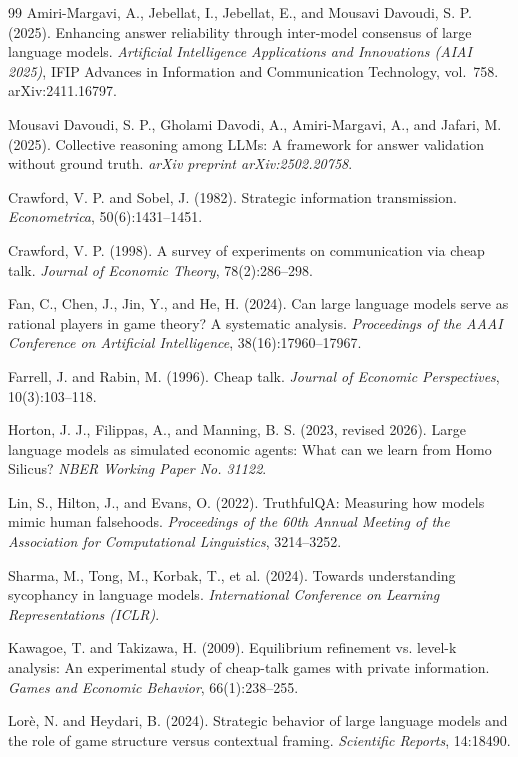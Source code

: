 \documentclass[11pt]{article}
\begin{document}
\begin{thebibliography}{99}
Amiri-Margavi, A., Jebellat, I., Jebellat, E., and Mousavi Davoudi, S. P. (2025).
Enhancing answer reliability through inter-model consensus of large language models.
\emph{Artificial Intelligence Applications and Innovations (AIAI 2025)}, IFIP Advances in Information and Communication Technology, vol.~758. arXiv:2411.16797.

Mousavi Davoudi, S. P., Gholami Davodi, A., Amiri-Margavi, A., and Jafari, M. (2025).
Collective reasoning among LLMs: A framework for answer validation without ground truth.
\emph{arXiv preprint arXiv:2502.20758}.

Crawford, V. P. and Sobel, J. (1982).
Strategic information transmission.
\emph{Econometrica}, 50(6):1431--1451.

Crawford, V. P. (1998).
A survey of experiments on communication via cheap talk.
\emph{Journal of Economic Theory}, 78(2):286--298.

Fan, C., Chen, J., Jin, Y., and He, H. (2024).
Can large language models serve as rational players in game theory? A systematic analysis.
\emph{Proceedings of the AAAI Conference on Artificial Intelligence}, 38(16):17960--17967.

Farrell, J. and Rabin, M. (1996).
Cheap talk.
\emph{Journal of Economic Perspectives}, 10(3):103--118.

Horton, J. J., Filippas, A., and Manning, B. S. (2023, revised 2026).
Large language models as simulated economic agents: What can we learn from Homo Silicus?
\emph{NBER Working Paper No. 31122}.

Lin, S., Hilton, J., and Evans, O. (2022).
TruthfulQA: Measuring how models mimic human falsehoods.
\emph{Proceedings of the 60th Annual Meeting of the Association for Computational Linguistics}, 3214--3252.

Sharma, M., Tong, M., Korbak, T., et al. (2024).
Towards understanding sycophancy in language models.
\emph{International Conference on Learning Representations (ICLR)}.

Kawagoe, T. and Takizawa, H. (2009).
Equilibrium refinement vs. level-k analysis: An experimental study of cheap-talk games with private information.
\emph{Games and Economic Behavior}, 66(1):238--255.

Lor\`e, N. and Heydari, B. (2024).
Strategic behavior of large language models and the role of game structure versus contextual framing.
\emph{Scientific Reports}, 14:18490.

\end{thebibliography}
\end{document}
